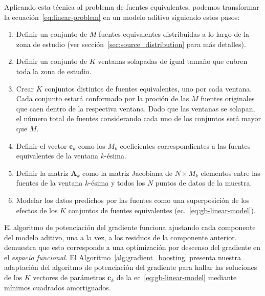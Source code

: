Aplicando esta técnica al problema de fuentes equivalentes, podemos transformar
la ecuación~\ref{eq:linear-problem} en un modelo aditivo siguiendo estos
pasos:

\begin{enumerate}
  \item Definir un conjunto de $M$ fuentes equivalentes distribuidas a lo
      largo de la zona de estudio (ver sección~\ref{sec:source_distribution}
      para más detalles).
  \item Definir un conjunto de $K$ ventanas solapadas de igual tamaño que
      cubren toda la zona de estudio.
  \item Crear $K$ conjuntos distintos de fuentes equivalentes, uno por cada
      ventana.
      Cada conjunto estará conformado por la proción de las $M$ fuentes
      originales que caen dentro de la respectiva ventana.
      Dado que las ventanas se solapan, el número total de fuentes considerando
      cada uno de los conjuntos será mayor que $M$.
  \item Definir el vector $\mathbf{c}_k$ como los $M_k$ coeficientes
      correspondientes a las fuentes equivalentes de la ventana $k$-ésima.
  \item Definir la matriz $\mathbf{A}_k$ como la matriz Jacobiana de $N \times
      M_k$ elementos entre las fuentes de la ventana $k$-ésima y todos los $N$
      puntos de datos de la muestra.
  \item Modelar los datos predichos por las fuentes como una superposición de
      los efectos de los $K$ conjuntos de fuentes equivalentes
      (ec.~\ref{eq:gb-linear-model}).
\end{enumerate}

El algoritmo de potenciación del gradiente funciona ajustando cada componente
del modelo aditivo, una a la vez, a los residuos de la componente anterior.
\citet{friedman2001} demuestra que esto corresponde a una optimización por
descenso del gradiente en el \emph{espacio funcional}.
El Algoritmo~\ref{alg:gradient_boosting} presenta nuestra adaptación del
algoritmo de potenciación del gradiente para hallar las soluciones  de los $K$
vectores de parámetros $\mathbf{c}_k$ de la ec~\ref{eq:gb-linear-model}
mediante mínimos cuadrados amortiguados.

